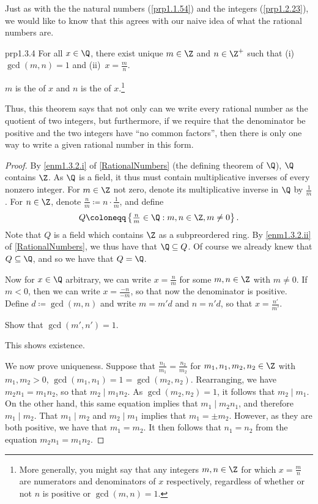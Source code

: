 Just as with the the natural numbers (\cref{prp1.1.54}) and the integers (\cref{prp1.2.23}), we would like to know that this agrees with our naive idea of what the rational numbers are.
\begin{prp}{}{prp1.3.4}
For all $x\in \Q$, there exist unique $m\in \Z$ and $n\in \Z^+$ such that (i)~$\gcd (m,n)=1$ and (ii)~$x=\frac{m}{n}$.
\begin{rmk}
$m$ is the  of $x$ and $n$ is the  of $x$.\footnote{More generally, you might say that any integers $m,n\in \Z$ for which $x=\frac{m}{n}$ are numerators and denominators of $x$ respectively, regardless of whether or not $n$ is positive or $\gcd (m,n)=1$.}
\end{rmk}
\begin{rmk}
Thus, this theorem says that not only can we write every rational number as the quotient of two integers, but furthermore, if we require that the denominator be positive and the two integers have ``no common factors'', then there is only one way to write a given rational number in this form.
\end{rmk}
\begin{proof}
By \cref{enm1.3.2.i} of \cref{RationalNumbers} (the defining theorem of $\Q$), $\Q$ contains $\Z$.  As $\Q$ is a field, it thus must contain multiplicative inverses of every nonzero integer.  For $m\in \Z$ not zero, denote its multiplicative inverse in $\Q$ by $\frac{1}{m}$.  For $n\in \Z$, denote $\frac{n}{m}\coloneqq n\cdot \frac{1}{m}$, and define
\begin{equation}
Q\coloneqq \left\{ \tfrac{n}{m}\in \Q :m,n\in \Z ,m\neq 0\right\} .
\end{equation}
Note that $Q$ is a field which contains $\Z$ as a subpreordered ring.  By \cref{enm1.3.2.ii} of \cref{RationalNumbers}, we thus have that $\Q \subseteq Q$.  Of course we already knew that $Q\subseteq \Q$, and so we have that $Q=\Q$.

Now for $x\in \Q$ arbitrary, we can write $x=\frac{n}{m}$ for some $m,n\in \Z$ with $m\neq 0$.  If $m<0$, then we can write $x=\frac{-n}{-m}$, so that now the denominator is positive.  Define $d\coloneqq \gcd (m,n)$ and write $m=m'd$ and $n=n'd$, so that $x=\frac{n'}{m'}$.
\begin{exr}{}{}
Show that $\gcd (m',n')=1$.
\end{exr}
This shows existence.

We now prove uniqueness.  Suppose that $\frac{n_1}{m_1}=\frac{n_2}{m_2}$ for $m_1,n_1,m_2,n_2\in \Z$ with $m_1,m_2>0$, $\gcd (m_1,n_1)=1=\gcd (m_2,n_2)$.  Rearranging, we have $m_2n_1=m_1n_2$, so that $m_2\mid m_1n_2$.  As $\gcd (m_2,n_2)=1$, it follows that $m_2\mid m_1$.  On the other hand, this same equation implies that $m_1\mid m_2n_1$, and therefore $m_1\mid m_2$.  That $m_1\mid m_2$ and $m_2\mid m_1$ implies that $m_1=\pm m_2$.  However, as they are both positive, we have that $m_1=m_2$.  It then follows that $n_1=n_2$ from the equation $m_2n_1=m_1n_2$.
\end{proof}
\end{prp}
